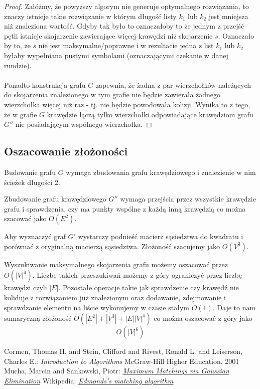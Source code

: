 \documentclass{llncs}
\begin{document}
\begin{proof}
Załóżmy, że powyższy algorym nie generuje optymalnego rozwiązania, to znaczy istnieje
takie rozwiązanie w którym długość listy $k_1$ lub $k_2$ jest mniejsza niż znaleziona wartość.
Gdyby tak było to oznaczałoby to że jednym z przejść pętli istnieje
skojarzenie zawierające więcej krawędzi niż skojarzenie $s$. 
Oznaczało by to, że $s$ nie jest maksymalne/poprawne i w rezultacie jedna z list $k_1$ lub $k_2$ byłaby wypełniana pustymi
symbolami (oznaczającymi czekanie w danej rundzie). 
\\\\
Ponadto konstrukcja grafu $G$ zapewnia, że żadna z par wierzchołków należących do skojarzenia znalezionego w tym grafie nie będzie zawierała żadnego wierzchołka więcej niż raz - tj. nie będzie powodowała kolizji. Wynika to z tego, że w grafie $G$ krawędzie łączą tylko wierzchołki odpowiadające krawędziom grafu $G''$ nie posiadającym wspólnego wierzchołka.
\end{proof}

\subsection{Oszacowanie złożoności}
Budowanie grafu $G$ wymaga zbudowania grafu krawędziowego i znalezienie w nim ścieżek długości 2. 


Zbudowanie grafu krawędziowego $G''$
wymaga przejścia przez wszystkie krawędzie grafu i sprawdzenia, czy ma punkty wspólne z każdą inną krawędzią co można 
szacować jako $O(E^2)$. 


Aby wyznaczyć graf $G'$ wystarczy podnieść macierz sąsiedztwa do kwadratu i porównać z oryginalną macierzą sąsiedztwa. Złożoność szacujemy jako $O(V^3)$.

 
Wyszukiwanie maksymalnego skojarzenia grafu możemy oszacować przez $O(|V|^4)$\cite{wiki-blossom}.
Liczbę takich przeszukiwań możemy z góry ograniczyć przez liczbę krawędzi czyli $|E|$. 
Pozostałe operacje takie jak sprawdzenie czy krawędź nie koliduje z rozwiązaniem już znalezionym
oraz dodawanie, zdejmowanie i sprawdzanie elementu na liście wykonujemy w czasie stałym $O(1)$.
Daje to nam sumaryczną złożoność $O(|E^2|+|V^3|+|E||V|^4)$ co można oszacować z góry jako 
\begin{equation}
O(|V|^6)
\end{equation}
%
%
\begin{thebibliography}{4}
%
Cormen, Thomas H. and Stein, Clifford and Rivest, Ronald L. and Leiserson, Charles E.:
\textsl{Introduction to Algorithms}
McGraw-Hill Higher Education, 2001
Mucha, Marcin and Sankowski, Piotr:
\textsl{\href{http://www.mimuw.edu.pl/~mucha/pub/mucha_sankowski_focs04.pdf}{Maximum Matchings via Gaussian Elimination}}
Wikipedia:
\textsl{\href{http://en.wikipedia.org/wiki/Blossom_algorithm}{Edmonds's matching algorithm}}
\end{thebibliography}
\end{document}
